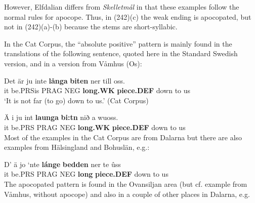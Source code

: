 {
\z 
\z 

However, Elfdalian differs from \textit{Skelletmål} in that these examples follow the normal rules for apocope. Thus, in (242)(c) the weak ending is apocopated, but not in (242)(a){}-(b) because the stems are short-syllabic.


In the Cat Corpus, the “absolute positive” pattern is mainly found in the translations of the following sentence, quoted here in the Standard Swedish version, and in a version from Våmhus (Os):


\ea\label{}
\gll Det  är  ju  inte  \textbf{långa}\textbf{  biten} ner  till  oss.\\
it  be.PRSis  PRAG  NEG  \textbf{long.WK} \textbf{piece.DEF} down  to  us\\
\glt ‘It is not far (to go) down to us.’ (Cat Corpus)
\z

\ea\label{}
\gll Ä  i  ju  int  \textbf{launga} \textbf{bi:tn} nið  a  wuoss.\\
it  be.PRS  PRAG  NEG  \textbf{long.WK} \textbf{piece.DEF} down  to  us\\
\z
Most of the examples in the Cat Corpus are from Dalarna but there are also examples from Hälsingland and Bohuslän, e.g.:


\ea\label{}
\gll D’  ä  jo  ‘nte  \textbf{lánge} \textbf{bedden} ner  te  ûss\\
it  be.PRS  PRAG  NEG  \textbf{long} \textbf{piece.DEF} down  to  us\\
\z
The apocopated pattern is found in the Ovansiljan area (but cf. example from Våmhus, without apocope) and also in a couple of other places in Dalarna, e.g.

}
